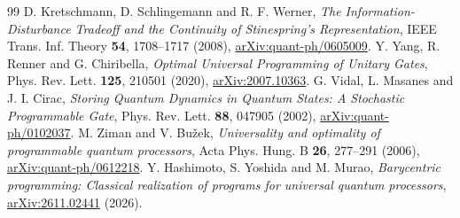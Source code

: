\documentclass[11pt]{article}
\theoremstyle{remark}
\begin{document}
\begin{thebibliography}{99}
D. Kretschmann, D. Schlingemann and R. F. Werner,
\emph{The Information-Disturbance Tradeoff and the Continuity of
Stinespring's Representation},
IEEE Trans. Inf. Theory \textbf{54}, 1708--1717 (2008),
\href{https://arxiv.org/abs/quant-ph/0605009}{arXiv:quant-ph/0605009}.
Y. Yang, R. Renner and G. Chiribella,
\emph{Optimal Universal Programming of Unitary Gates},
Phys. Rev. Lett. \textbf{125}, 210501 (2020),
\href{https://arxiv.org/abs/2007.10363}{arXiv:2007.10363}.
G. Vidal, L. Masanes and J. I. Cirac,
\emph{Storing Quantum Dynamics in Quantum States: A Stochastic
Programmable Gate},
Phys. Rev. Lett. \textbf{88}, 047905 (2002),
\href{https://arxiv.org/abs/quant-ph/0102037}{arXiv:quant-ph/0102037}.
M. Ziman and V. Bu\v{z}ek,
\emph{Universality and optimality of programmable quantum processors},
Acta Phys. Hung. B \textbf{26}, 277--291 (2006),
\href{https://arxiv.org/abs/quant-ph/0612218}{arXiv:quant-ph/0612218}.
Y. Hashimoto, S. Yoshida and M. Murao,
\emph{Barycentric programming: Classical realization of programs for
universal quantum processors},
\href{https://arxiv.org/abs/2611.02441}{arXiv:2611.02441} (2026).
\end{thebibliography}
\end{document}
